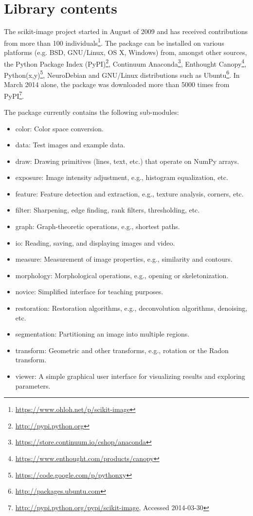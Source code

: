 
\section*{Library contents}
  \label{library-contents}

  The scikit-image project started in August of 2009 and has received contributions from more than 100 individuals\footnote{\url{https://www.ohloh.net/p/scikit-image}}.  The package can be installed on various platforms (e.g. BSD, GNU/Linux, OS X, Windows) from, amongst other sources, the Python Package Index (PyPI)\footnote{\url{http://pypi.python.org}}, Continuum Anaconda\footnote{\url{https://store.continuum.io/cshop/anaconda}}, Enthought Canopy\footnote{\url{https://www.enthought.com/products/canopy}}, Python(x,y)\footnote{\url{https://code.google.com/p/pythonxy}}, NeuroDebian \citep{neurodebian} and GNU/Linux distributions such as Ubuntu\footnote{\url{http://packages.ubuntu.com}}. In March 2014 alone, the package was downloaded more than 5000 times from PyPI\footnote{\url{http://pypi.python.org/pypi/scikit-image}, Accessed 2014-03-30}.

  The package currently contains the following sub-modules:

  \begin{itemize}

    \item color: Color space conversion.
    \item data: Test images and example data.
    \item draw: Drawing primitives (lines, text, etc.) that operate on NumPy arrays.
    \item exposure: Image intensity adjustment, e.g., histogram equalization, etc.
    \item feature: Feature detection and extraction, e.g., texture analysis, corners, etc.
    \item filter: Sharpening, edge finding, rank filters, thresholding, etc.
    \item graph: Graph-theoretic operations, e.g., shortest paths.
    \item io: Reading, saving, and displaying images and video.
    \item measure: Measurement of image properties, e.g., similarity and contours.
    \item morphology: Morphological operations, e.g., opening or skeletonization.
    \item novice: Simplified interface for teaching purposes.
    \item restoration: Restoration algorithms, e.g., deconvolution algorithms, denoising, etc.
    \item segmentation: Partitioning an image into multiple regions.
    \item transform: Geometric and other transforms, e.g., rotation or the Radon transform.
    \item viewer: A simple graphical user interface for visualizing results and exploring parameters.

  \end{itemize}
